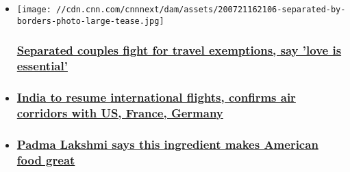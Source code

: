 \begin{itemize}
\item
  \href{/travel/article/couples-separated-travel-bans-covid-19/index.html}{}

  \texttt{[image: //cdn.cnn.com/cnnnext/dam/assets/200721162106-separated-by-borders-photo-large-tease.jpg]}

  \hypertarget{separated-couples-fight-for-travel-exemptions-say-love-is-essential}{%
  \subsubsection{\texorpdfstring{\href{/travel/article/couples-separated-travel-bans-covid-19/index.html}{Separated
  couples fight for travel exemptions, say 'love is
  essential'}}{Separated couples fight for travel exemptions, say 'love is essential'}}\label{separated-couples-fight-for-travel-exemptions-say-love-is-essential}}
\item
  \hypertarget{india-to-resume-international-flights-confirms-air-corridors-with-us-france-germany-}{%
  \subsubsection{\texorpdfstring{\href{/travel/article/india-resumes-international-flights/index.html}{India
  to resume international flights, confirms air corridors with US,
  France, Germany
  }}{India to resume international flights, confirms air corridors with US, France, Germany }}\label{india-to-resume-international-flights-confirms-air-corridors-with-us-france-germany-}}
\item
  \hypertarget{padma-lakshmi-says-this-ingredient-makes-american-food-great}{%
  \subsubsection{\texorpdfstring{\href{/travel/article/padma-lakshmi-taste-the-nation-interview/index.html}{Padma
  Lakshmi says this ingredient makes American food
  great}}{Padma Lakshmi says this ingredient makes American food great}}\label{padma-lakshmi-says-this-ingredient-makes-american-food-great}}
\end{itemize}

